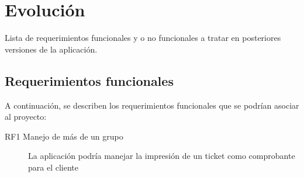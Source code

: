 \chapter{Evolución}

	
	Lista de requerimientos funcionales y o no funcionales a tratar en posteriores versiones de la aplicación. 
	
	\section{Requerimientos funcionales}
	A continuación, se describen los requerimientos funcionales que se podrían asociar al proyecto:
	\begin{description}
		\item[RF1 Manejo de más de un grupo] La aplicación podría manejar la impresión de un ticket como comprobante para el cliente 
	\end{description}
	
	